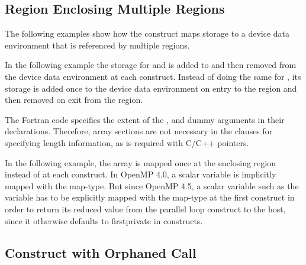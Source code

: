 
\subsection{ Region Enclosing Multiple  Regions}
\label{subsec:target_data_multiregion}

The following examples show how the  construct maps storage
to a device data environment that is referenced by multiple  regions. 

In the following example the storage for  and  is
added to and then removed from the device data environment at each 
construct. Instead of doing the same for , its storage is added
once to the device data environment on entry to the 
region and then removed on exit from the region.


The Fortran code specifies the extent of the ,  and
 dummy arguments in their declarations. Therefore, array sections are
not necessary in the  clauses for specifying length information, as is
required with C/C++ pointers.

\clearpage

In the following example, the array  is mapped once at the enclosing 
 region instead of at each  construct.
In OpenMP 4.0, a scalar variable is implicitly mapped with the  map-type.
But since OpenMP 4.5, a scalar variable such as the  variable has to
be explicitly mapped with the  map-type at the first
 construct in order to return its reduced value from the parallel
loop construct to the host, since it otherwise defaults to firstprivate in
 constructs.



\subsection{ Construct with Orphaned Call}

